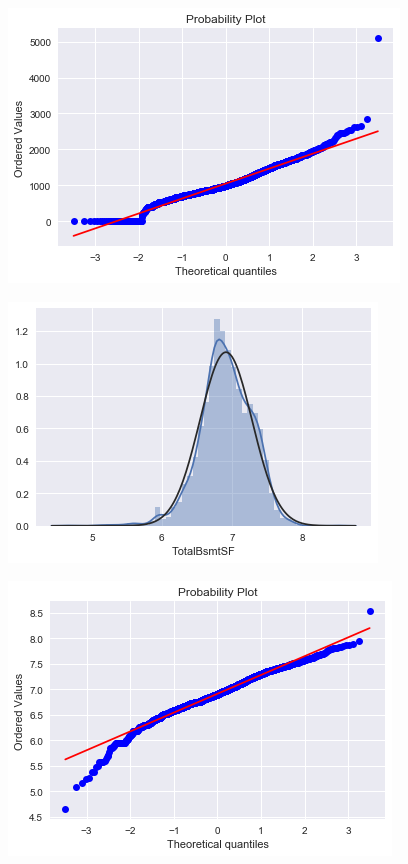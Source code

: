 \documentclass{article}
\begin{document}
			\begin{figure}[H]
				\centering
				\includegraphics[scale=0.8]{../img/totalbsmtsf_norm_2}
				\caption{}
			\end{figure}
			
			\begin{figure}[H]
				\centering
				\includegraphics[scale=0.8]{../img/totalbsmtsf_norm_after_1}
				\caption{}
			\end{figure}
			
			\begin{figure}[H]
				\centering
				\includegraphics[scale=0.8]{../img/totalbsmtsf_norm_after_2}
				\caption{}
			\end{figure}						
						
\end{document}

